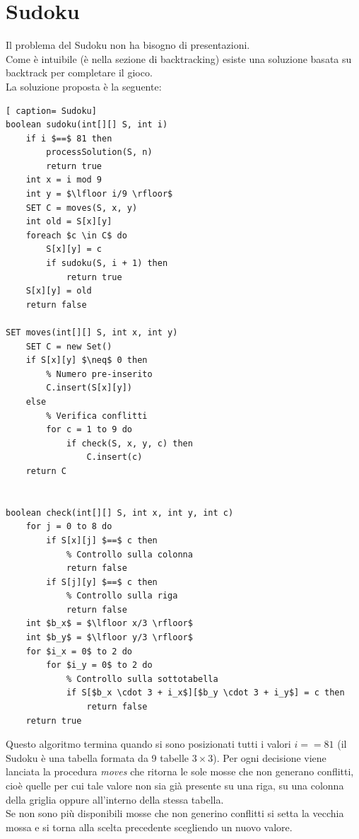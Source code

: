 \documentclass[../cheatSheetAlgoritmi.tex]{subfiles}
\begin{document}
\section{Sudoku}
Il problema del Sudoku non ha bisogno di presentazioni. \\
Come è intuibile (è nella sezione di backtracking) esiste una soluzione basata su backtrack per completare il gioco. \\
La soluzione proposta è la seguente: 
 \begin{lstlisting}[ caption= Sudoku]
boolean sudoku(int[][] S, int i)
	if i $==$ 81 then
		processSolution(S, n)
		return true
	int x = i mod 9
	int y = $\lfloor i/9 \rfloor$
	SET C = moves(S, x, y)
	int old = S[x][y]
	foreach $c \in C$ do
		S[x][y] = c
		if sudoku(S, i + 1) then
			return true
	S[x][y] = old
	return false
	
SET moves(int[][] S, int x, int y)
	SET C = new Set()
	if S[x][y] $\neq$ 0 then
		% Numero pre-inserito
		C.insert(S[x][y])
	else
		% Verifica conflitti
		for c = 1 to 9 do
			if check(S, x, y, c) then
				C.insert(c)
	return C
	
	
boolean check(int[][] S, int x, int y, int c)
	for j = 0 to 8 do
		if S[x][j] $==$ c then
			% Controllo sulla colonna
			return false
		if S[j][y] $==$ c then
			% Controllo sulla riga
			return false
	int $b_x$ = $\lfloor x/3 \rfloor$
	int $b_y$ = $\lfloor y/3 \rfloor$
	for $i_x = 0$ to 2 do
		for $i_y = 0$ to 2 do
			% Controllo sulla sottotabella
			if S[$b_x \cdot 3 + i_x$][$b_y \cdot 3 + i_y$] = c then
				return false
	return true 
\end{lstlisting}
Questo algoritmo termina quando si sono posizionati tutti i valori $i == 81$ (il Sudoku è una tabella formata da 9 tabelle $3 \times 3$). 
Per ogni decisione viene lanciata la procedura \emph{moves} che ritorna le sole mosse che non generano conflitti, cioè quelle per cui tale valore non sia già presente su una riga, su una colonna della griglia oppure all'interno della stessa tabella. \\ Se non sono più disponibili mosse che non generino conflitti si setta la vecchia mossa e si torna alla scelta precedente scegliendo un nuovo valore.
\end{document}

